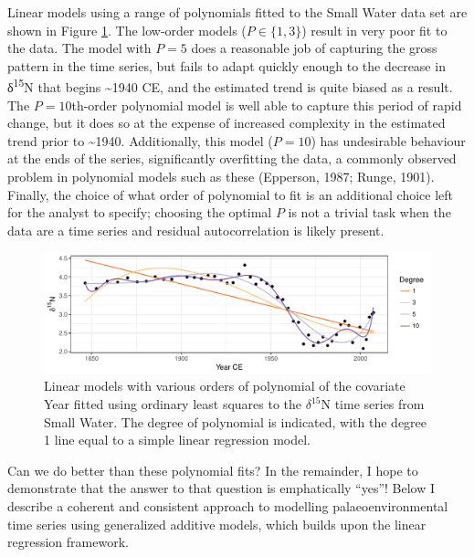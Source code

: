 \documentclass[12pt,]{article}
\begin{document}
Linear models using a range of polynomials fitted to the Small Water
data set are shown in Figure \ref{fig:polynomial-example-plot}. The
low-order models (\(P \in \{1, 3\}\)) result in very poor fit to the
data. The model with \(P = 5\) does a reasonable job of capturing the
gross pattern in the time series, but fails to adapt quickly enough to
the decrease in δ\textsuperscript{15}N that begins \textasciitilde{}1940
CE, and the estimated trend is quite biased as a result. The
\(P = 10\)th-order polynomial model is well able to capture this period
of rapid change, but it does so at the expense of increased complexity
in the estimated trend prior to \textasciitilde{}1940. Additionally,
this model (\(P = 10\)) has undesirable behaviour at the ends of the
series, significantly overfitting the data, a commonly observed problem
in polynomial models such as these (Epperson, 1987; Runge, 1901).
Finally, the choice of what order of polynomial to fit is an additional
choice left for the analyst to specify; choosing the optimal \(P\) is
not a trivial task when the data are a time series and residual
autocorrelation is likely present.

\begin{figure}

{\centering \includegraphics[width=0.8\linewidth]{manuscript_files/figure-latex/polynomial-example-plot-1} 

}

\caption{Linear models with various orders of polynomial of the covariate Year fitted using ordinary least squares to the $\delta^{15}\text{N}$ time series from Small Water. The degree of polynomial is indicated, with the degree 1 line equal to a simple linear regression model.}\label{fig:polynomial-example-plot}
\end{figure}

Can we do better than these polynomial fits? In the remainder, I hope to
demonstrate that the answer to that question is emphatically ``yes''!
Below I describe a coherent and consistent approach to modelling
palaeoenvironmental time series using generalized additive models, which
builds upon the linear regression framework.
\end{document}
